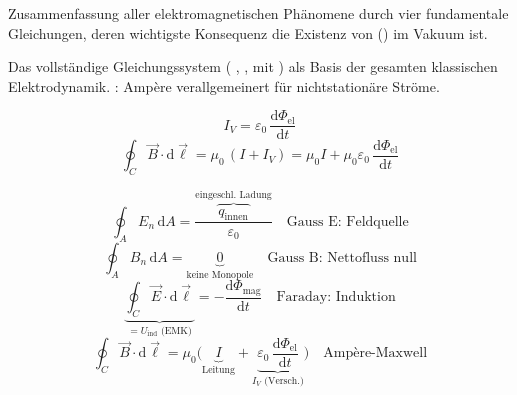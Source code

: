 

\begin{runintext}
Zusammenfassung aller elektromagnetischen Phänomene durch vier fundamentale Gleichungen, deren wichtigste Konsequenz die Existenz von  () im Vakuum ist.
\end{runintext}

\begin{runintext}
Das vollständige Gleichungssystem ( ,  ,   mit ) als Basis der gesamten klassischen Elektrodynamik. : Ampère verallgemeinert für nichtstationäre Ströme.
\end{runintext}
\begin{formulabox}[Verschiebungsstrom]
\[ I_V = \varepsilon_0\,\frac{\mathrm{d}\Phi_{\mathrm{el}}}{\mathrm{d}t} \]
\[ \oint_C \vec{B}\cdot\mathrm{d}\vec{\ell} = \mu_0\,(I + I_V) = \mu_0 I + \mu_0\varepsilon_0\,\frac{\mathrm{d}\Phi_{\mathrm{el}}}{\mathrm{d}t} \]
\end{formulabox}
\begin{formulabox}
\[ \oint_A E_n\,\mathrm{d}A = \frac{\overbrace{q_{\mathrm{innen}}}^{\text{eingeschl. Ladung}}}{\varepsilon_0} \quad \text{Gauss E: Feldquelle} \]
\formulasep
\[ \oint_A B_n\,\mathrm{d}A = \underbrace{0}_{\text{keine Monopole}} \quad \text{Gauss B: Nettofluss null} \]
\formulasep
\[ \underbrace{\oint_C \vec{E}\cdot\mathrm{d}\vec{\ell}}_{= U_{\mathrm{ind}}\text{ (EMK)}} = -\frac{\mathrm{d}\Phi_{\mathrm{mag}}}{\mathrm{d}t} \quad \text{Faraday: Induktion} \]
\formulasep
\[ \oint_C \vec{B}\cdot\mathrm{d}\vec{\ell} = \mu_0\Big(\!\underbrace{I}_{\text{Leitung}} + \underbrace{\varepsilon_0\,\frac{\mathrm{d}\Phi_{\mathrm{el}}}{\mathrm{d}t}}_{I_V\text{ (Versch.)}}\!\Big) \quad \text{Ampère-Maxwell} \]
\end{formulabox}

